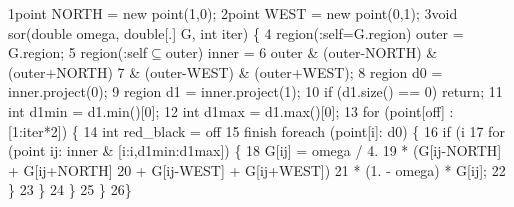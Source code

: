 \begin{tightcode}
\quad\num{1}point NORTH = new point(1,0);
\quad\num{2}point WEST  = new point(0,1);
\quad\num{3}void sor(double omega, double[.] G, int iter) \{
\quad\num{4}  region(:self=G.region) outer = G.region;
\quad\num{5}  region(:self$\subseteq$outer) inner =
\quad\num{6}    outer & (outer-NORTH) & (outer+NORTH)
\quad\num{7}          & (outer-WEST)  & (outer+WEST);
\quad\num{8}  region d0 = inner.project(0);
\quad\num{9}  region d1 = inner.project(1);
\quad\num{10}  if (d1.size() == 0) return;
\quad\num{11}  int d1min = d1.min()[0];
\quad\num{12}  int d1max = d1.max()[0];
\quad\num{13}  for (point[off] : [1:iter*2]) \{
\quad\num{14}    int red\_black = off %
\quad\num{15}    finish foreach (point[i]: d0) \{
\quad\num{16}      if (i %
\quad\num{17}        for (point ij: inner & [i:i,d1min:d1max]) \{
\quad\num{18}          G[ij] = omega / 4.
\quad\num{19}                * (G[ij-NORTH] + G[ij+NORTH]
\quad\num{20}                 + G[ij-WEST]  + G[ij+WEST])
\quad\num{21}                * (1. - omega) * G[ij];
\quad\num{22}        \}
\quad\num{23}      \}
\quad\num{24}    \}
\quad\num{25}  \}
\quad\num{26}\}
\end{tightcode}
